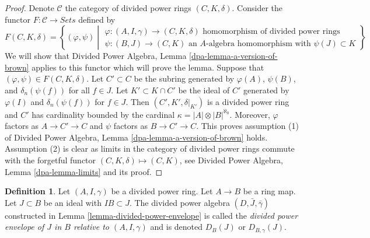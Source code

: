 \documentclass{stacks-project}
\theoremstyle{plain}
\theoremstyle{definition}
\newtheorem{definition}[subsection]{Definition}
\theoremstyle{remark}
\numberwithin{equation}{subsection}
\begin{document}
\begin{proof}
Denote $\mathcal{C}$ the category of divided power rings
$(C, K, \delta)$. Consider the functor
$F : \mathcal{C} \longrightarrow \textit{Sets}$ defined by
$$
F(C, K, \delta) =
\left\{
(\varphi, \psi)
\middle|
\begin{matrix}
\varphi : (A, I, \gamma) \to (C, K, \delta)
\text{ homomorphism of divided power rings} \\
\psi : (B, J) \to (C, K)\text{ an }
A\text{-algebra homomorphism with }\psi(J) \subset K
\end{matrix}
\right\}
$$
We will show that
Divided Power Algebra, Lemma \ref{dpa-lemma-a-version-of-brown}
applies to this functor which will
prove the lemma. Suppose that $(\varphi, \psi) \in F(C, K, \delta)$.
Let $C' \subset C$ be the subring generated by $\varphi(A)$,
$\psi(B)$, and $\delta_n(\psi(f))$ for all $f \in J$.
Let $K' \subset K \cap C'$ be the ideal of $C'$ generated by
$\varphi(I)$ and $\delta_n(\psi(f))$ for $f \in J$.
Then $(C', K', \delta|_{K'})$ is a divided power ring and
$C'$ has cardinality bounded by the cardinal
$\kappa = |A| \otimes |B|^{\aleph_0}$.
Moreover, $\varphi$ factors as $A \to C' \to C$ and $\psi$ factors
as $B \to C' \to C$. This proves assumption (1) of
Divided Power Algebra, Lemma \ref{dpa-lemma-a-version-of-brown}
holds. Assumption (2) is clear
as limits in the category of divided power rings commute with the
forgetful functor $(C, K, \delta) \mapsto (C, K)$, see
Divided Power Algebra, Lemma \ref{dpa-lemma-limits} and its proof.
\end{proof}

\begin{definition}
\label{definition-divided-power-envelope}
Let $(A, I, \gamma)$ be a divided power ring.
Let $A \to B$ be a ring map. Let $J \subset B$ be an ideal
with $IB \subset J$. The divided power algebra $(D, \bar J, \bar\gamma)$
constructed in Lemma \ref{lemma-divided-power-envelope}
is called the {\it divided power envelope of $J$ in $B$
relative to $(A, I, \gamma)$} and is denoted $D_B(J)$ or $D_{B, \gamma}(J)$.
\end{definition}
\end{document}
